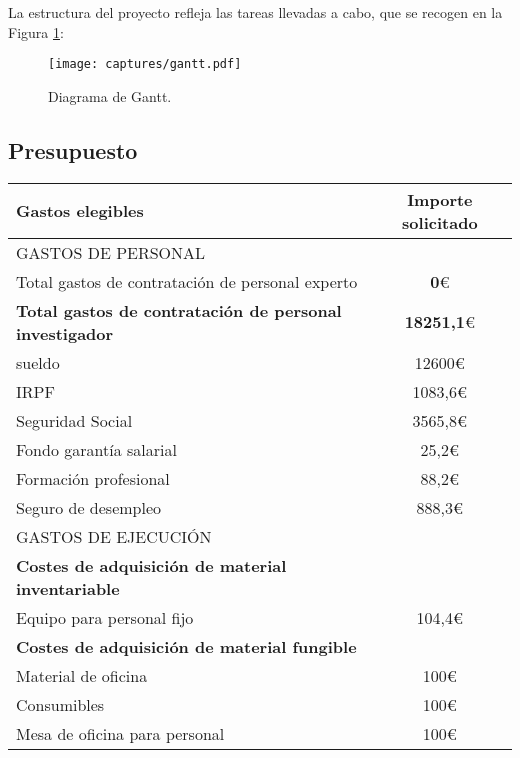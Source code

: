 \documentclass[11pt,fleqn]{book} %
\begin{document}
La estructura del proyecto refleja las tareas llevadas a cabo, que se recogen en la Figura \ref{fig:gantt}:

\begin{figure}[H]
	\centering\texttt{[image: captures/gantt.pdf]}
	\caption{Diagrama de Gantt.}
	\label{fig:gantt} %
\end{figure}

\subsection{Presupuesto}

\begin{table}[H]
	\begin{center}
		\begin{tabular}{|l|c|} \hline
			\cellcolor{red} Gastos elegibles & Importe solicitado \\
			\hline \hline
			\cellcolor[gray]{0.5}GASTOS DE PERSONAL &  \\ \hline
			Total gastos de contratación de personal experto & \textbf{0}\euro \\ \hline
			\cellcolor[gray]{0.8} \textbf{Total gastos de contratación de personal investigador} & \textbf{18251,1}\euro \\ \hline
			sueldo & 12600\euro \\ \hline
			IRPF & 1083,6\euro \\ \hline
			Seguridad Social & 3565,8\euro \\ \hline
			Fondo garantía salarial & 25,2\euro \\ \hline
			Formación profesional & 88,2\euro \\ \hline
			Seguro de desempleo &  888,3\euro \\ \hline
			\cellcolor[gray]{0.5}GASTOS DE EJECUCIÓN &  \\ \hline
			\cellcolor[gray]{0.8}\textbf{Costes de adquisición de material inventariable} &  \\ \hline
			Equipo para personal fijo & 104,4\euro  \\ \hline
			\cellcolor[gray]{0.8}\textbf{Costes de adquisición de material fungible} &  \\ \hline
			Material de oficina & 100\euro \\ \hline
			Consumibles & 100\euro \\ \hline
			Mesa de oficina para personal &  100\euro \\ \hline

\end{tabular}
\end{center}
\end{table}
\end{document}
